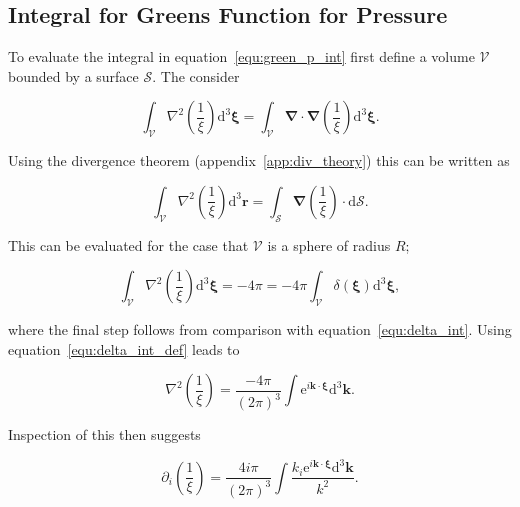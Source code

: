 \documentclass[12pt]{article}
\begin{document}
\subsection{Integral for Greens Function for Pressure}
\label{sub_app:green_p}

To evaluate the integral in equation~\ref{equ:green_p_int} first define a volume $\mathcal{V}$ bounded by a surface $\mathcal{S}$. The consider

\begin{equation}
\label{equ:int_del_recip}
\int_{\mathcal{V}} \nabla^{2} \left(\frac{1}{\xi}\right) \mathrm{d} ^{3} \boldsymbol{\xi} = \int_{\mathcal{V}} \boldsymbol{\nabla} \cdot \boldsymbol{\nabla} \left(\frac{1}{\xi}\right) \mathrm{d} ^{3} \boldsymbol{\xi} .
\end{equation}

Using the divergence theorem (appendix~\ref{app:div_theory}) this can be written as

\begin{equation}
\label{equ:sint_del_recip}
\int_{\mathcal{V}} \nabla^{2} \left(\frac{1}{\xi}\right) \mathrm{d} ^{3} \boldsymbol{r} = \int_{\mathcal{S}} \boldsymbol{\nabla} \left(\frac{1}{\xi}\right) \cdot \mathrm{d} \mathcal{S} .
\end{equation}

This can be evaluated for the case that $\mathcal{V}$ is a sphere of radius $R$;

\begin{equation}
\label{equ:int_del_recip_eval}
\int_{\mathcal{V}} \nabla^{2} \left(\frac{1}{\xi}\right) \mathrm{d} ^{3} \boldsymbol{\xi} = - 4 \pi = -4 \pi \int_{\mathcal{V}} \delta(\boldsymbol{\xi}) \mathrm{d}^{3} \boldsymbol{\xi} ,
\end{equation}

where the final step follows from comparison with equation~\ref{equ:delta_int}. Using equation~\ref{equ:delta_int_def} leads to

\begin{equation}
\label{equ:del_square_recip}
\nabla^{2} \left(\frac{1}{\xi}\right) = \frac{-4 \pi}{(2 \pi)^{3}} \int \mathrm{e}^{i \boldsymbol{k} \cdot \boldsymbol{\xi}} \mathrm{d}^{3} \boldsymbol{k} .
\end{equation}

Inspection of this then suggests

\begin{equation}
\label{equ:grad_recip}
\partial_{i} \left(\frac{1}{\xi}\right) = \frac{4 i \pi}{(2 \pi)^{3}} \int \frac{ k_{i} \mathrm{e}^{i \boldsymbol{k} \cdot \boldsymbol{\xi}} \mathrm{d}^{3} \boldsymbol{k}}{k^{2}} .
\end{equation}
\end{document}
